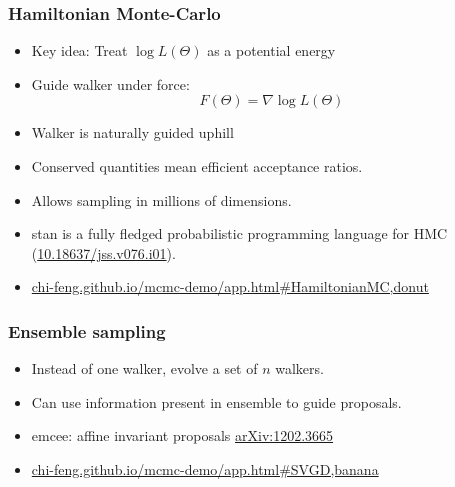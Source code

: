 \documentclass[%
]{beamer}
\begin{document}
\begin{frame}
  \frametitle{Hamiltonian Monte-Carlo} 
  \begin{itemize}
      \item Key idea: Treat $\log L(\Theta)$ as a potential energy
      \item Guide walker under force: \[F(\Theta) =\nabla \log L(\Theta)\]
      \item Walker is naturally guided uphill
      \item Conserved quantities mean efficient acceptance ratios.
      \item Allows sampling in millions of dimensions.
      \item stan is a fully fledged probabilistic programming language for HMC (\href{https://www.jstatsoft.org/article/view/v076i01}{10.18637/jss.v076.i01}).
      \item \href{https://chi-feng.github.io/mcmc-demo/app.html\#HamiltonianMC,donut}{chi-feng.github.io/mcmc-demo/app.html\#HamiltonianMC,donut}
  \end{itemize}
\end{frame}


\begin{frame}
  \frametitle{Ensemble sampling} 
  \begin{itemize}
      \item Instead of one walker, evolve a set of $n$ walkers.
      \item Can use information present in ensemble to guide proposals.
      \item emcee: affine invariant proposals \href{https://arxiv.org/abs/1202.3665}{arXiv:1202.3665}
      \item \href{https://chi-feng.github.io/mcmc-demo/app.html\#SVGD,banana}{chi-feng.github.io/mcmc-demo/app.html\#SVGD,banana}
  \end{itemize}
\end{frame}
\end{document}
